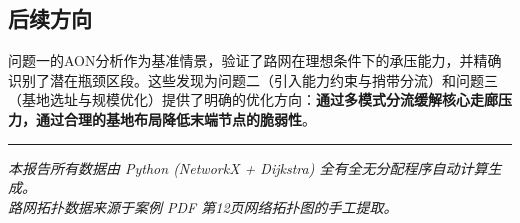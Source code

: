\documentclass[12pt,a4paper,fontset=none]{ctexart}
\begin{document}
\subsection{后续方向}

问题一的AON分析作为基准情景，验证了路网在理想条件下的承压能力，并精确识别了潜在瓶颈区段。这些发现为问题二（引入能力约束与捎带分流）和问题三（基地选址与规模优化）提供了明确的优化方向：\textbf{通过多模式分流缓解核心走廊压力，通过合理的基地布局降低末端节点的脆弱性}。

\vspace{16pt}
\noindent\rule{\textwidth}{0.5pt}
\vspace{8pt}

\begin{center}
\small\textit{本报告所有数据由 Python (NetworkX + Dijkstra) 全有全无分配程序自动计算生成。\\
路网拓扑数据来源于案例 PDF 第12页网络拓扑图的手工提取。}
\end{center}
\end{document}
